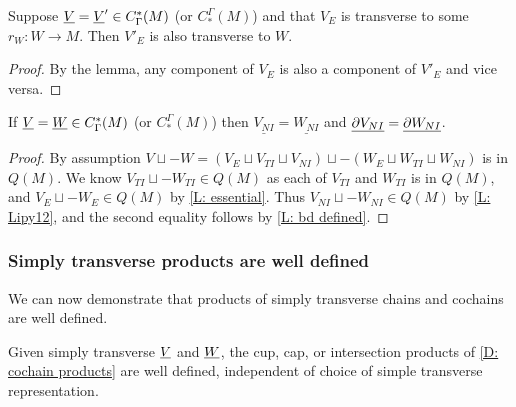 \begin{corollary}\label{C: essential trans}
	Suppose $\underline{V} = \underline{V}' \in C^*_\Gamma(M)$ (or $C_*^\Gamma(M)$) and that $V_E$ is transverse to some $r_W \colon W \to M$.
	Then $V'_E$ is also transverse to $W$.
\end{corollary}

\begin{proof}
	By the lemma, any component of $V_E$ is also a component of $V'_E$ and vice versa.
\end{proof}

\begin{lemma}\label{L: same NI}
	If $\underline{V} = \underline{W} \in C^*_\Gamma(M)$ (or $C_*^\Gamma(M)$) then
	$\underline{ V_{NI}} = \underline{ W_{NI}}$ and
	$\underline{\partial V_{NI}} = \underline{\partial W_{NI}}$.
\end{lemma}

\begin{proof}
	By assumption $V\sqcup-W = (V_E \sqcup V_{TI} \sqcup V_{NI}) \sqcup -(W_E \sqcup W_{TI} \sqcup W_{NI})$ is in $Q(M)$.
	We know $V_{TI} \sqcup -W_{TI} \in Q(M)$ as each of $V_{TI}$ and $W_{TI}$ is in $Q(M)$, and $V_E \sqcup -W_E \in Q(M)$ by \cref{L: essential}.
	Thus $V_{NI} \sqcup -W_{NI} \in Q(M)$ by \cref{L: Lipy12}, and the second equality follows by \cref{L: bd defined}.
\end{proof}

\subsubsection{Simply transverse products are well defined}\label{S: simple proof}

We can now demonstrate that products of simply transverse chains and cochains are well defined.

\begin{theorem}\label{T: cochain product}
	Given simply transverse $\underline{V}$ and $\underline{W}$, the cup, cap, or intersection products of \cref{D: cochain products} are well defined, independent of choice of simple transverse representation.
\end{theorem}

